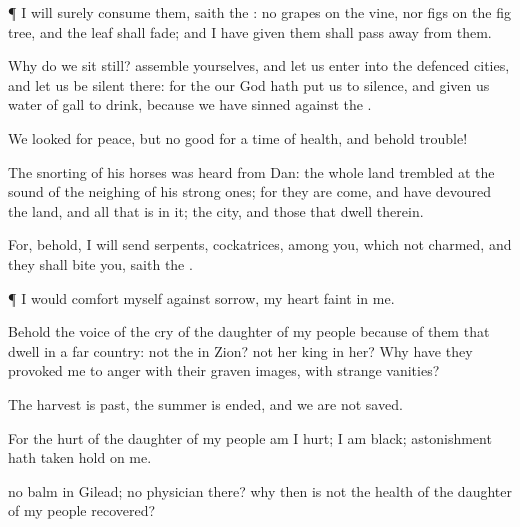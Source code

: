 {\par }{\PP {}¶ I will
surely
consume them,
saith the
{}:
{} no
grapes on the
vine, nor
figs on the fig
tree, and the
leaf shall
fade; and
{} I have
given them shall pass
away from them.

Why do we sit
still?
assemble yourselves, and let us
enter into the
defenced
cities, and let us be
silent there: for the
{} our
God hath put us to
silence, and given us
water of
gall to
drink, because we have
sinned against the
{}.

We
looked for
peace, but no
good
{} for a
time of
health, and behold
trouble!

The
snorting of his
horses was
heard from
Dan: the whole
land
trembled at the
sound of the
neighing of his strong
ones; for they are
come, and have
devoured the
land, and
all that is in it; the
city, and those that
dwell therein.

For, behold, I will
send
serpents,
cockatrices, among you, which
{} not
{}
charmed, and they shall
bite you,
saith the
{}.


\par }{\PP {}¶
{} I would
comfort myself against
sorrow, my
heart
{}
faint in me.

Behold the
voice of the
cry of the
daughter of my
people because of them that dwell in a
far
country:
{} not the
{} in
Zion?
{} not her
king in her? Why have they provoked me to
anger with their graven
images,
{} with
strange
vanities?

The
harvest is
past, the
summer is
ended, and we are not
saved.

For the
hurt of the
daughter of my
people am I
hurt; I am
black;
astonishment hath taken
hold on me.

 no
balm in
Gilead;
{} no
physician there? why
then is not the
health of the
daughter of my
people
recovered?




\par }
